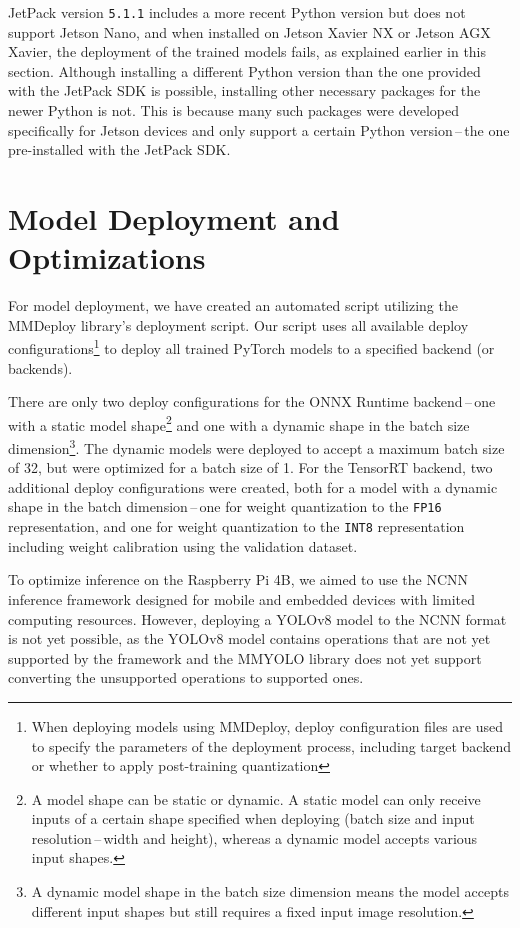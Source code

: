 JetPack version \texttt{5.1.1} includes a more recent Python version but does
not support Jetson Nano, and when installed on Jetson Xavier NX or Jetson AGX
Xavier, the deployment of the trained models fails, as explained earlier in this
section. Although installing a different Python version than the one provided
with the JetPack SDK is possible, installing other necessary packages for the
newer Python is not. This is because many such packages were developed
specifically for Jetson devices and only support a certain Python
version\,--\,the one pre-installed with the JetPack SDK.


\section{Model Deployment and Optimizations}


For model deployment, we have created an automated script utilizing the MMDeploy
library's deployment script. Our script uses all available deploy
configurations\footnote{When deploying models using MMDeploy, deploy
configuration files are used to specify the parameters of the deployment process,
including target backend or whether to apply post-training quantization} to
deploy all trained PyTorch models to a specified backend (or backends).

There are only two deploy configurations for the ONNX Runtime backend\,--\,one
with a static model shape\footnote{A model shape can be static or dynamic. A
static model can only receive inputs of a certain shape specified when deploying
(batch size and input resolution\,--\,width and height), whereas a dynamic model
accepts various input shapes.} and one with a dynamic shape in the batch size
dimension\footnote{A dynamic model shape in the batch size dimension means the
model accepts different input shapes but still requires a fixed input image
resolution.}. The dynamic models were deployed to accept a maximum batch size of
32, but were optimized for a batch size of 1.  For the TensorRT backend, two
additional deploy configurations were created, both for a model with a dynamic
shape in the batch dimension\,--\,one for weight quantization to the
\texttt{FP16} representation, and one for weight quantization to the
\texttt{INT8} representation including weight calibration using the validation
dataset.

To optimize inference on the Raspberry Pi 4B, we aimed to use the NCNN inference
framework designed for mobile and embedded devices with limited computing
resources. However, deploying a YOLOv8 model to the NCNN format is not yet
possible, as the YOLOv8 model contains operations that are not yet supported by
the framework and the MMYOLO library does not yet support converting the
unsupported operations to supported ones.



